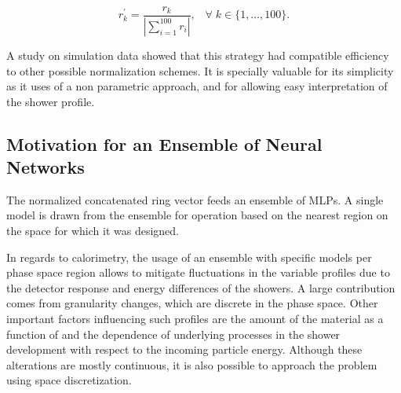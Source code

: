 \begin{equation}
  r^\prime_{k} = \frac{r_{k}}{| \sum\limits_{i=1}^{100} r_i
  |}, \;\;\;
    \forall \; k\in\{1,\dots,100\}.
\label{eq:ring_norm}
\end{equation}

A study on simulation data showed that this strategy had compatible
efficiency to other possible normalization schemes. It is specially valuable for its
simplicity as it uses of a non parametric approach, and for allowing easy interpretation of the shower profile. 


\subsection{Motivation for an Ensemble of Neural Networks}\label{top:nn_ensemble}

The normalized concatenated ring vector feeds an ensemble of MLPs. A single
model is drawn from the ensemble for operation based on the nearest region on the \eteta space for which it was designed.

In regards to calorimetry, the usage of an ensemble with specific models per
phase space region allows to mitigate fluctuations in the variable profiles
due to the detector response and energy differences of the showers.
A large contribution comes from granularity changes, which are discrete
in the phase space. Other important factors 
influencing such profiles are the
amount of the material as a function of \abseta{} and the dependence of
underlying processes in the shower development with respect to the incoming
particle energy. Although these alterations are mostly continuous, it is also
possible to approach the problem using space discretization.


